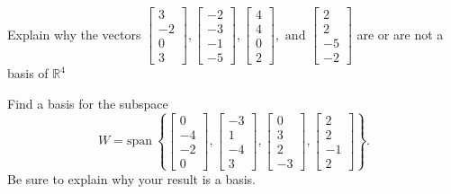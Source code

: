 \documentclass{article}
\begin{document}
\begin{exerciseStatement}
    Explain why the vectors \(\left[\begin{array}{r}
3 \\
-2 \\
0 \\
3
\end{array}\right] , \left[\begin{array}{r}
-2 \\
-3 \\
-1 \\
-5
\end{array}\right] , \left[\begin{array}{r}
4 \\
4 \\
0 \\
2
\end{array}\right] , \text{ and } \left[\begin{array}{r}
2 \\
2 \\
-5 \\
-2
\end{array}\right]\) are or are not a basis of \(\mathbb{R}^4\)


  
\end{exerciseStatement}


\begin{exerciseStatement}
    Find a basis for the subspace
\[W=\mathrm{span}\ \left\{\left[\begin{array}{r}
0 \\
-4 \\
-2 \\
0
\end{array}\right] , \left[\begin{array}{r}
-3 \\
1 \\
-4 \\
3
\end{array}\right] , \left[\begin{array}{r}
0 \\
3 \\
2 \\
-3
\end{array}\right] , \left[\begin{array}{r}
2 \\
2 \\
-1 \\
2
\end{array}\right]\right\}.\]
 Be sure to explain why your result is a basis.


  
\end{exerciseStatement}
\end{document}
